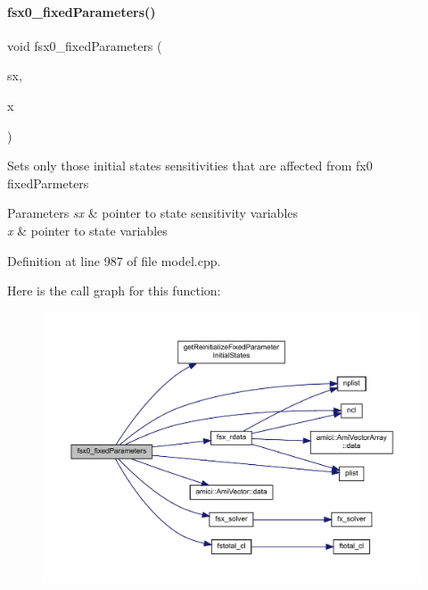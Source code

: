 \paragraph{\texorpdfstring{fsx0\_fixedParameters()}{fsx0\_fixedParameters()}\hspace{0.1cm}{\footnotesize\ttfamily [1/2]}}
{\footnotesize\ttfamily void fsx0\+\_\+fixed\+Parameters (\begin{DoxyParamCaption}\item[{\mbox{\hyperlink{classamici_1_1_ami_vector_array}{Ami\+Vector\+Array}} $\ast$}]{sx,  }\item[{const \mbox{\hyperlink{classamici_1_1_ami_vector}{Ami\+Vector}} $\ast$}]{x }\end{DoxyParamCaption})}

Sets only those initial states sensitivities that are affected from fx0 fixed\+Parmeters 
\begin{DoxyParams}{Parameters}
{\em sx} & pointer to state sensitivity variables \\
\hline
{\em x} & pointer to state variables \\
\hline
\end{DoxyParams}


Definition at line 987 of file model.\+cpp.

Here is the call graph for this function\+:
\nopagebreak
\begin{figure}[H]
\begin{center}
\leavevmode
\includegraphics[width=350pt]{classamici_1_1_model_acd951497e01220e545bbb238cc48e7bb_cgraph}
\end{center}
\end{figure}
\mbox{\label{classamici_1_1_model_a946b60982bd7321bcc2bdae10ea8358f}} 
